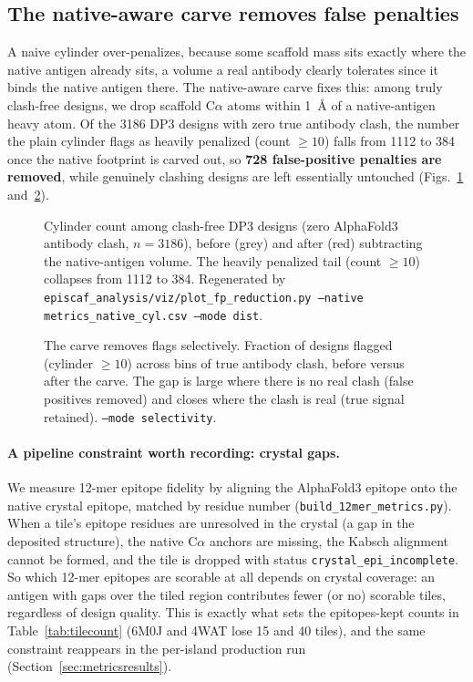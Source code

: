 \subsection{The native-aware carve removes false penalties}\label{sec:carve}
A naive cylinder over-penalizes, because some scaffold mass sits exactly where the native
antigen already sits, a volume a real antibody clearly tolerates since it binds the native
antigen there. The native-aware carve fixes this: among truly clash-free designs, we drop
scaffold C$\alpha$ atoms within \SI{1}{\angstrom} of a native-antigen heavy atom. Of the
\num{3186} DP3 designs with zero true antibody clash, the number the plain cylinder flags as
heavily penalized (count $\ge 10$) falls from \num{1112} to \num{384} once the native
footprint is carved out, so \textbf{\num{728} false-positive penalties are removed}, while
genuinely clashing designs are left essentially untouched (Figs.~\ref{fig:fp}
and~\ref{fig:fpsel}).

\begin{figure}[h]\centering
{}
\caption{Cylinder count among clash-free DP3 designs (zero AlphaFold3 antibody clash,
$n=\num{3186}$), before (grey) and after (red) subtracting the native-antigen volume. The
heavily penalized tail (count $\ge 10$) collapses from \num{1112} to \num{384}. Regenerated
by \texttt{episcaf\_analysis/viz/plot\_fp\_reduction.py --native metrics\_native\_cyl.csv
--mode dist}.}
\label{fig:fp}
\end{figure}

\begin{figure}[h]\centering
{}
\caption{The carve removes flags selectively. Fraction of designs flagged (cylinder
$\ge 10$) across bins of true antibody clash, before versus after the carve. The gap is
large where there is no real clash (false positives removed) and closes where the clash is
real (true signal retained). \texttt{--mode selectivity}.}
\label{fig:fpsel}
\end{figure}

\paragraph{A pipeline constraint worth recording: crystal gaps.}
We measure 12-mer epitope fidelity by aligning the AlphaFold3 epitope onto the native crystal
epitope, matched by residue number (\texttt{build\_12mer\_metrics.py}). When a tile's epitope
residues are unresolved in the crystal (a gap in the deposited structure), the native
C$\alpha$ anchors are missing, the Kabsch alignment cannot be formed, and the tile is dropped
with status \texttt{crystal\_epi\_incomplete}. So which 12-mer epitopes are scorable at all
depends on crystal coverage: an antigen with gaps over the tiled region contributes fewer (or
no) scorable tiles, regardless of design quality. This is exactly what sets the
epitopes-kept counts in Table~\ref{tab:tilecount} (6M0J and 4WAT lose 15 and 40 tiles), and the
same constraint reappears in the per-island production run (Section~\ref{sec:metricsresults}).

